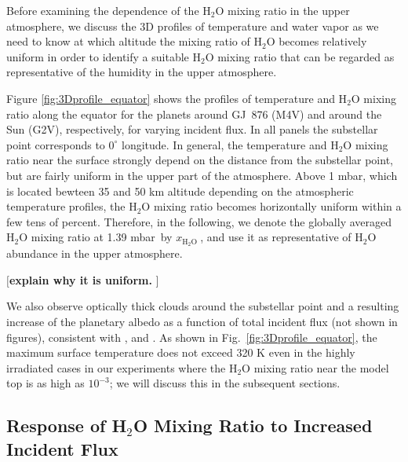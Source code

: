\documentclass[11pt,numberedappendix,twocolappendix,]{emulateapj}
\def\water{H$_2$O }
\def\xwater{$x_\text{\water}$}
\def\preslevel{1.39 mbar\ }
\def\memo#1{\color{red}$[${\bf #1}$]$ \color{black}}
\begin{document}
Before examining the dependence of the \water mixing ratio in the upper atmosphere, we discuss the 3D profiles of temperature and water vapor as we need to know at which altitude the mixing ratio of \water becomes relatively uniform in order to identify a suitable \water mixing ratio that can be regarded as representative of the humidity in the upper atmosphere. 

Figure \ref{fig:3Dprofile_equator} shows the profiles of temperature and \water mixing ratio along the equator for the planets around GJ~876 (M4V) and around the Sun (G2V), respectively, for varying incident flux. 
In all panels the substellar point corresponds to $0^{\circ }$ longitude. 
In general, the temperature and \water mixing ratio near the surface strongly depend on the distance from the substellar point, but are fairly uniform in the upper part of the atmosphere. 
Above 1 mbar, which is located bewteen 35 and 50 km altitude depending on the atmospheric temperature profiles, the \water mixing ratio becomes horizontally uniform within a few tens of percent. 
Therefore, in the following, we denote the globally averaged \water mixing ratio at \preslevel by \xwater, and use it as representative of \water abundance in the upper atmosphere. 

\memo{explain why it is uniform. }

We also observe optically thick clouds around the substellar point and a resulting increase of the planetary albedo as a function of total incident flux (not shown in figures), consistent with \citet{Yang2013,Yang2014}, \citet{Kopparapu2016} and \citet{Way2016}. 
As shown in Fig.~\ref{fig:3Dprofile_equator}, the maximum surface temperature does not exceed 320 K even in the highly irradiated cases in our experiments where the \water mixing ratio near the model top is as high as $10^{-3}$; we will discuss this in the subsequent sections. 


\subsection{Response of \water Mixing Ratio to Increased Incident Flux}
\label{ss:result_H2Omixingratio}
\end{document}

